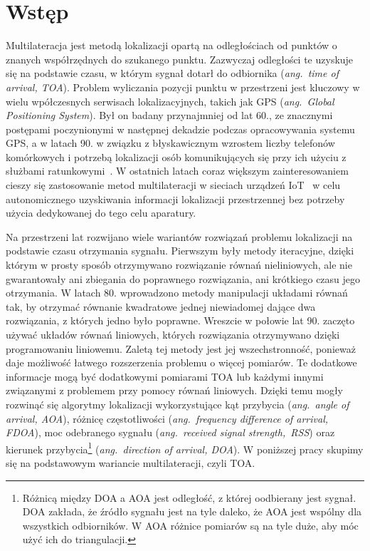 \chapter*{Wstęp}\label{chap:introduction}

Multilateracja jest metodą lokalizacji opartą na odległościach od punktów o znanych współrzędnych do szukanego punktu. Zazwyczaj odległości te uzyskuje się na podstawie czasu, w którym sygnał dotarł do odbiornika (\textit{ang.\ time of arrival, TOA}). Problem wyliczania pozycji punktu w przestrzeni jest kluczowy w wielu wpółczesnych serwisach lokalizacyjnych, takich jak GPS (\textit{ang.\ Global Positioning System}). Był on badany przynajmniej od lat 60., ze znacznymi postępami poczynionymi w następnej dekadzie podczas opracowywania systemu GPS, a w latach 90. w związku z błyskawicznym wzrostem liczby telefonów komórkowych i potrzebą lokalizacji osób komunikujących się przy ich użyciu z służbami ratunkowymi~\cite{govinfo}. W ostatnich latach coraz większym zainteresowaniem cieszy się zastosowanie metod multilateracji w sieciach urządzeń IoT~\cite{9184896} w celu autonomicznego uzyskiwania informacji lokalizacji przestrzennej bez potrzeby użycia dedykowanej do tego celu aparatury.

Na przestrzeni lat rozwijano wiele wariantów rozwiązań problemu lokalizacji na podstawie czasu otrzymania sygnału. Pierwszym były metody iteracyjne, dzięki którym w prosty sposób otrzymywano rozwiązanie równań nieliniowych, ale nie gwarantowały ani zbiegania do poprawnego rozwiązania, ani krótkiego czasu jego otrzymania. W latach 80. wprowadzono metody manipulacji układami równań tak, by otrzymać równanie kwadratowe jednej niewiadomej dające dwa rozwiązania, z których jedno było poprawne. Wreszcie w połowie lat 90. zaczęto używać układów równań liniowych, których rozwiązania otrzymywano dzięki programowaniu liniowemu. Zaletą tej metody jest jej wszechstronność, ponieważ daje możliwość łatwego rozszerzenia problemu o więcej pomiarów. Te dodatkowe informacje mogą być dodatkowymi  pomiarami TOA lub każdymi innymi związanymi z problemem przy pomocy równań liniowych. Dzięki temu mogły rozwinąć się algorytmy lokalizacji wykorzystujące kąt przybycia (\textit{ang.\ angle of arrival, AOA}), różnicę częstotliwości (\textit{ang.\ frequency difference of arrival, FDOA}), moc odebranego sygnału (\textit{ang.\ received signal strength,\ RSS}) oraz kierunek przybycia\footnote{Różnicą między DOA a AOA jest odległość, z której oodbierany jest sygnał. DOA zakłada, że źródło sygnału jest na tyle daleko, że AOA jest wspólny dla wszystkich odbiorników. W AOA różnice pomiarów są na tyle duże, aby móc użyć ich do triangulacji.} (\textit{ang.\ direction of arrival, DOA}). W poniższej pracy skupimy się na podstawowym wariancie multilateracji, czyli TOA.

